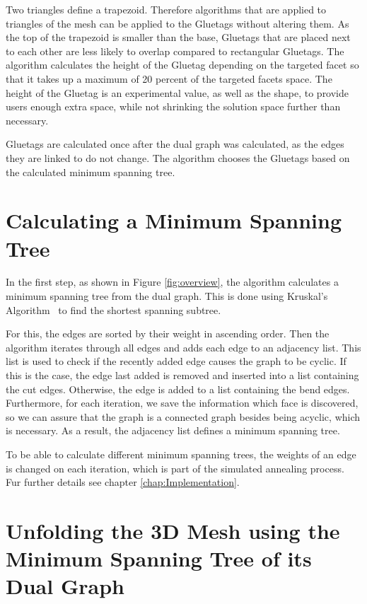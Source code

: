 \documentclass[draft,final]{vutinfth} %
\begin{document}
Two triangles define a trapezoid. Therefore algorithms that are applied to triangles of the mesh can be applied to the Gluetags without altering them. As the top of the trapezoid is smaller than the base, Gluetags that are placed next to each other are less likely to overlap compared to rectangular Gluetags. The algorithm calculates the height of the Gluetag depending on the targeted facet so that it takes up a maximum of 20 percent of the targeted facets space. The height of the Gluetag is an experimental value, as well as the shape, to provide users enough extra space, while not shrinking the solution space further than necessary.

Gluetags are calculated once after the dual graph was calculated, as the edges they are linked to do not change. The algorithm chooses the Gluetags based on the calculated minimum spanning tree.

\section{Calculating a Minimum Spanning Tree}
\label{sec:calcmsp}
In the first step, as shown in Figure \ref{fig:overview}, the algorithm calculates a minimum spanning tree from the dual graph. This is done using Kruskal's Algorithm~\cite{kruskal1956shortest} to find the shortest spanning subtree.

For this, the edges are sorted by their weight in ascending order. Then the algorithm iterates through all edges and adds each edge to an adjacency list. This list is used to check if the recently added edge causes the graph to be cyclic. If this is the case, the edge last added is removed and inserted into a list containing the cut edges. Otherwise, the edge is added to a list containing the bend edges. Furthermore, for each iteration, we save the information which face is discovered, so we can assure that the graph is a connected graph besides being acyclic, which is necessary. As a result, the adjacency list defines a minimum spanning tree.

To be able to calculate different minimum spanning trees, the weights of an edge is changed on each iteration, which is part of the simulated annealing process. Fur further details see chapter \ref{chap:Implementation}.

\section{Unfolding the 3D Mesh using the Minimum Spanning Tree of its Dual Graph}
\label{sec:unfold}
\end{document}
